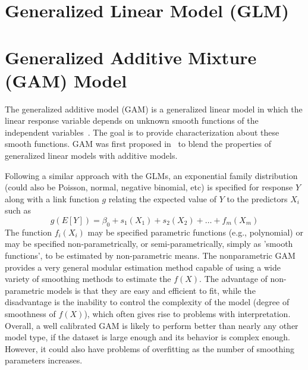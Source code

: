 \documentclass [11pt, proquest] {uwthesis}[2015/03/03]
\begin{document}
\section{Generalized Linear Model (GLM)}

\section{Generalized Additive Mixture (GAM) Model}
\label{sec:gamintro}
The generalized additive model (GAM) is a generalized linear model in which the linear response variable depends on unknown smooth functions of the independent variables~\cite{Wiki}. The goal is to provide characterization about these smooth functions. GAM was first proposed in~\cite{Hastie86}	 to blend the properties of generalized linear models with additive models. 

Following a similar approach with the GLMs, an exponential family distribution (could also be Poisson, normal, negative binomial, etc) is specified for response $Y$ along with a link function $g$ relating the expected value of $Y$ to the predictors $X_i$ such as
\begin{equation*}
g(E[Y]) = \beta_0 + s_1(X_1) + s_2(X_2) + \hdots + f_m(X_m)
\end{equation*}
The function $f_i(X_i)$ may be specified parametric functions (e.g., polynomial) or may be specified non-parametrically, or semi-parametrically, simply as 'smooth functions', to be estimated by non-parametric means. The nonparametric GAM provides a very general modular estimation method capable of using a wide variety of smoothing methods to estimate the $f(X)$. The advantage of non-parametric models is that they are easy and efficient to fit, while the disadvantage is the inability to control the complexity of the model (degree of smoothness of $f(X)$), which often gives rise to problems with interpretation. Overall, a well calibrated GAM is likely to perform better than nearly any other model type, if the dataset is large enough and its behavior is complex enough. However, it could also have problems of overfitting as the number of smoothing parameters increases. 
\end{document}
